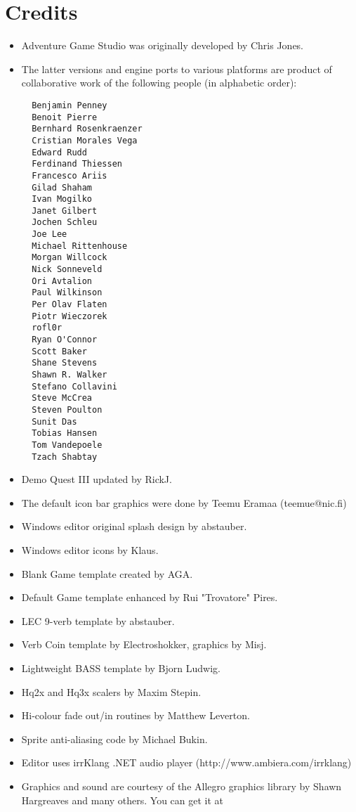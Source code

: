 \chapter{Credits}\label{Credits}%

\begin{itemize}
\item Adventure Game Studio was originally developed by Chris Jones.
\item The latter versions and engine ports to various platforms are product of collaborative work of the following people (in alphabetic order):
\begin{verbatim}
  Benjamin Penney
  Benoit Pierre
  Bernhard Rosenkraenzer
  Cristian Morales Vega
  Edward Rudd
  Ferdinand Thiessen
  Francesco Ariis
  Gilad Shaham
  Ivan Mogilko
  Janet Gilbert
  Jochen Schleu
  Joe Lee
  Michael Rittenhouse
  Morgan Willcock
  Nick Sonneveld
  Ori Avtalion
  Paul Wilkinson
  Per Olav Flaten
  Piotr Wieczorek
  rofl0r
  Ryan O'Connor
  Scott Baker
  Shane Stevens
  Shawn R. Walker
  Stefano Collavini
  Steve McCrea
  Steven Poulton
  Sunit Das
  Tobias Hansen
  Tom Vandepoele
  Tzach Shabtay
\end{verbatim}
\item Demo Quest III updated by RickJ.
\item The default icon bar graphics were done by Teemu Eramaa (teemue@nic.fi)
\item Windows editor original splash design by abstauber.
\item Windows editor icons by Klaus.
\item Blank Game template created by AGA.
\item Default Game template enhanced by Rui "Trovatore" Pires.
\item LEC 9-verb template by abstauber.
\item Verb Coin template by Electroshokker, graphics by Misj.
\item Lightweight BASS template by Bjorn Ludwig.
\item Hq2x and Hq3x scalers by Maxim Stepin.
\item Hi-colour fade out/in routines by Matthew Leverton.
\item Sprite anti-aliasing code by Michael Bukin.
\item Editor uses irrKlang .NET audio player (http://www.ambiera.com/irrklang)
\item Graphics and sound are courtesy of the Allegro graphics library by Shawn
  Hargreaves and many others. You can get it at

\end{itemize}

